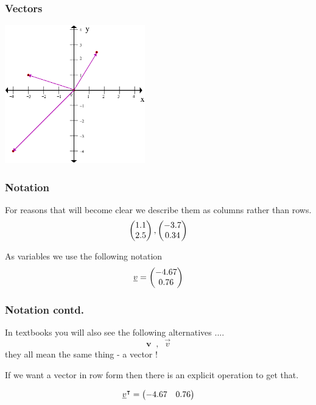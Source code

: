 \documentclass[hyperref={colorlinks=true},xcolor=svgnames]{beamer}
\begin{document}
\begin{frame}
\frametitle{Vectors}

\vskip1cm
\begin{center}
\includegraphics[height=6cm]{../Figures/2DGrid_plus_vector.png}
\end{center}

\end{frame}

\begin{frame}
\frametitle{Notation}
For reasons that will become clear we describe them as columns rather than rows.
\pause
\begin{equation}
\begin{pmatrix}1.1 \\ 2.5 \end{pmatrix}, \begin{pmatrix}-3.7 \\ 0.34 \end{pmatrix} 
\end{equation}


 
\pause
As variables we use the following notation
\begin{equation}
\underline{v} = \begin{pmatrix}-4.67 \\ 0.76 \end{pmatrix}
\end{equation}

\end{frame}

\begin{frame}
\frametitle{Notation contd.}

In textbooks you will also see the following alternatives ....
\[
\mathbf{v}\;\; , \;\; \vec{v}
\]
they all mean the same thing - a vector !

\pause
If we want a vector in row form then there is an explicit operation to get that.

\begin{equation}
\underline{v}^\intercal = \begin{pmatrix}-4.67 & 0.76 \end{pmatrix} 
\end{equation}

\end{frame}

\end{document}
